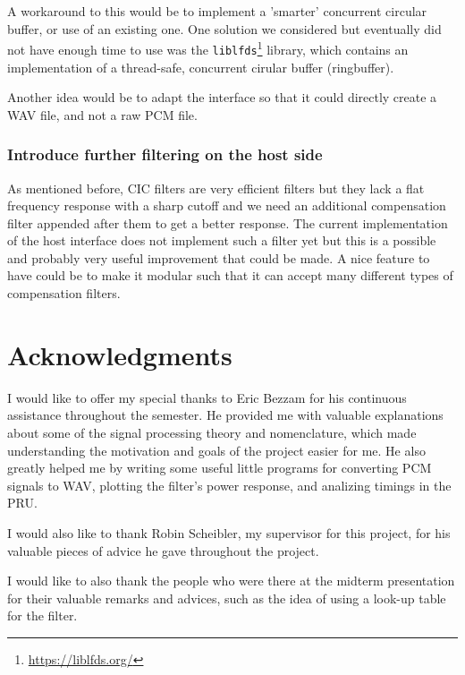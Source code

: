 \documentclass[]{report}
\begin{document}
A workaround to this would be to implement a 'smarter' concurrent circular buffer, or use of an existing one. One solution we considered but eventually did not have enough time to use was the \texttt{liblfds}\footnote{\url{https://liblfds.org/}} library, which contains an implementation of a thread-safe, concurrent cirular buffer (ringbuffer).

Another idea would be to adapt the interface so that it could directly create a WAV file, and not a raw PCM file.

\hypertarget{introduce-further-filtering-on-the-host-side}{%
\subsection{Introduce further filtering on the host
side}\label{introduce-further-filtering-on-the-host-side}}

As mentioned before, CIC filters are very efficient filters but they lack a flat frequency response with a sharp cutoff and we need an additional compensation filter appended after them to get a better response. The current implementation of the host interface does not implement such a filter yet but this is a possible and probably very useful improvement that could be made. A nice feature to have could be to make it modular such that it can accept many different types of compensation filters.

\hypertarget{acknowledgments}{%
\chapter{Acknowledgments}\label{acknowledgments}}

I would like to offer my special thanks to Eric Bezzam for his continuous assistance throughout the semester. He provided me with valuable explanations about some of the signal processing theory and nomenclature, which made understanding the motivation and goals of the project easier for me. He also greatly helped me by writing some useful little programs for converting PCM signals to WAV, plotting the filter's power response, and analizing timings in the PRU.

I would also like to thank Robin Scheibler, my supervisor for this project, for his valuable pieces of advice he gave throughout the project.

I would like to also thank the people who were there at the midterm presentation for their valuable remarks and advices, such as the idea of using a look-up table for the filter.
\end{document}
